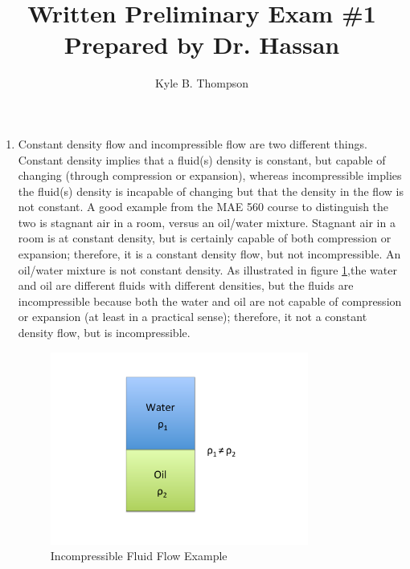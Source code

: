 \documentclass[a4paper]{report}
\title{Written Preliminary Exam \#1 \break
       Prepared by Dr. Hassan}
\author{ Kyle B. Thompson }
\begin{document}
\maketitle

\begin{enumerate}
  \item Constant density flow and incompressible flow are two different things.
    Constant density implies that a fluid(s) density is constant, but capable of
    changing (through compression or expansion), whereas incompressible implies
    the fluid(s) density is incapable of changing but that the density in the
    flow is not constant.  A good example from the MAE 560 course to distinguish
    the two is stagnant air in a room, versus an oil/water mixture.  Stagnant
    air in a room is at constant density, but is certainly capable of both
    compression or expansion; therefore, it is a constant density flow, but not
    incompressible.  An oil/water mixture is not constant density.  As
    illustrated in figure \ref{fig:incompressible},the
    water and oil are different fluids with different densities, but the fluids
    are incompressible because both the water and oil are not capable of
    compression or expansion (at least in a practical sense); therefore, it not
    a constant density flow, but is incompressible.

    \begin{figure}[h]
      \centering
      \includegraphics[width=0.8\textwidth,trim={0 2cm 0 2cm},clip]{oil_water_fig}
      \caption{Incompressible Fluid Flow Example}
      \label{fig:incompressible}
    \end{figure}


\end{enumerate}
\end{document}
